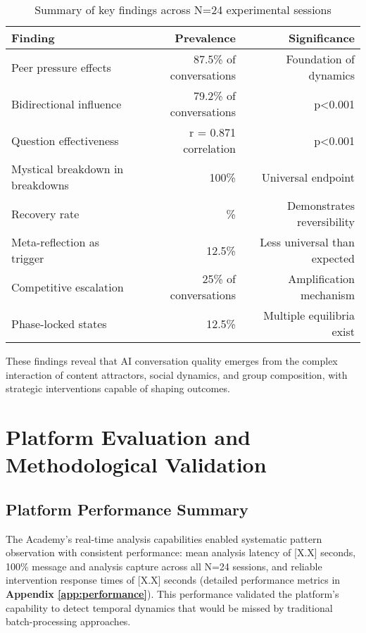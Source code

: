 \documentclass[11pt,letterpaper]{article}
\newcommand{\theacademy}{The Academy}
\newcommand{\exponedataTotalSessionsRaw}{24}
\newcommand{\exponedataRecoverySessionsRaw}{9}
\newcommand{\exponedataTotalSessions}{N=\exponedataTotalSessionsRaw}
\newcommand{\exponedataRecoveryPercentage}{%
  \fpeval{round(\exponedataRecoverySessionsRaw / \exponedataTotalSessionsRaw * 100, 1)}\%
}
\newcommand{\exponedataPeerPressurePercentage}{87.5\%}
\newcommand{\exponedataBidirectionalPercentage}{79.2\%}
\newcommand{\exponedataQuestionCorrelation}{0.871}
\newcommand{\exponedataQuestionPValue}{p<0.001}
\newcommand{\exponedataBidirectionalPValue}{p<0.001}
\newcommand{\exponedataMetaReflectionTriggers}{12.5\%}
\newcommand{\exponedataCompetitiveEscalationPercentage}{25\%}
\newcommand{\exponedataMysticalBreakdownInBreakdowns}{100\%}
\newcommand{\exponedataPhaseLockedPercentage}{12.5\%}
\newcommand{\platformLatency}{[X.X]}
\begin{document}
\begin{table}[h]
\centering
\begin{tabular}{lrr}
\toprule
\textbf{Finding} & \textbf{Prevalence} & \textbf{Significance} \\
\midrule
Peer pressure effects & \exponedataPeerPressurePercentage{} of conversations & Foundation of dynamics \\
Bidirectional influence & \exponedataBidirectionalPercentage{} of conversations & \exponedataBidirectionalPValue{} \\
Question effectiveness & r = \exponedataQuestionCorrelation{} correlation & \exponedataQuestionPValue{} \\
Mystical breakdown in breakdowns & \exponedataMysticalBreakdownInBreakdowns{} & Universal endpoint \\
Recovery rate & \exponedataRecoveryPercentage{} & Demonstrates reversibility \\
Meta-reflection as trigger & \exponedataMetaReflectionTriggers{} & Less universal than expected \\
Competitive escalation & \exponedataCompetitiveEscalationPercentage{} of conversations & Amplification mechanism \\
Phase-locked states & \exponedataPhaseLockedPercentage{} & Multiple equilibria exist \\
\bottomrule
\end{tabular}
\caption{Summary of key findings across \exponedataTotalSessions{} experimental sessions}
\label{tab:key_findings}
\end{table}

These findings reveal that AI conversation quality emerges from the complex interaction of content attractors, social dynamics, and group composition, with strategic interventions capable of shaping outcomes.

\section{Platform Evaluation and Methodological Validation}

\subsection{Platform Performance Summary}

\theacademy{}'s real-time analysis capabilities enabled systematic pattern observation with consistent performance: mean analysis latency of \platformLatency{} seconds, 100\% message and analysis capture across all \exponedataTotalSessions{} sessions, and reliable intervention response times of \platformLatency{} seconds (detailed performance metrics in \textbf{Appendix \ref{app:performance}}). This performance validated the platform's capability to detect temporal dynamics that would be missed by traditional batch-processing approaches.
\end{document}
